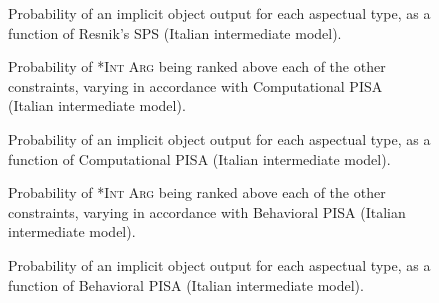 \begin{figure}[!htb]
\caption{Probability of an implicit object output for each aspectual type, as a function of Resnik's SPS (Italian intermediate model).}
    
\end{figure}



\begin{figure}[!htb]
\caption{Probability of \textsc{*Int Arg} being ranked above each of the other constraints, varying in accordance with Computational PISA (Italian intermediate model).}
    
\end{figure}

\begin{figure}[!htb]
\caption{Probability of an implicit object output for each aspectual type, as a function of Computational PISA (Italian intermediate model).}
    
\end{figure}



\begin{figure}[!htb]
\caption{Probability of \textsc{*Int Arg} being ranked above each of the other constraints, varying in accordance with Behavioral PISA (Italian intermediate model).}
    
\end{figure}

\begin{figure}[!htb]
\caption{Probability of an implicit object output for each aspectual type, as a function of Behavioral PISA (Italian intermediate model).}
    
\end{figure}


\clearpage %

